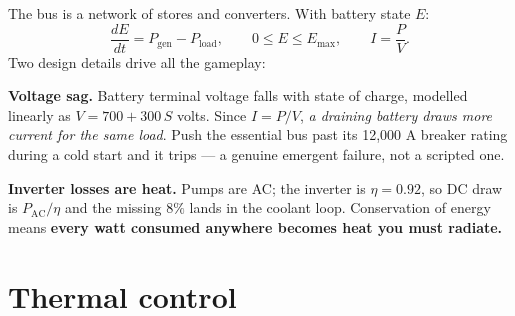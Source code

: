 \documentclass[11pt]{article}
\newcommand{\cbV}[3]{%
  \draw (#1,#2-0.28) -- (#1,#2-0.12);
  \draw (#1,#2+0.12) -- (#1,#2+0.28);
  \draw (#1,#2-0.12) -- ++(0.16,0.20);
  \fill (#1,#2-0.12) circle (0.5pt); \fill (#1,#2+0.12) circle (0.5pt);
  \node[lbl,right=1.0mm] at (#1,#2) {#3};}
\begin{document}
\begin{center}
\end{center}

The bus is a network of stores and converters. With battery state $E$:
\begin{equation}
\frac{dE}{dt}=P_{\text{gen}}-P_{\text{load}},\qquad 0\le E\le E_{\max},
\qquad I=\frac{P}{V}.
\end{equation}
Two design details drive all the gameplay:

\textbf{Voltage sag.} Battery terminal voltage falls with state of charge, modelled linearly as $V=700+300\,S$ volts. Since $I=P/V$, \emph{a draining battery draws more current for the same load}. Push the essential bus past its 12{,}000 A breaker rating during a cold start and it trips --- a genuine emergent failure, not a scripted one.

\textbf{Inverter losses are heat.} Pumps are AC; the inverter is $\eta=0.92$, so DC draw is $P_{\text{AC}}/\eta$ and the missing $8\%$ lands in the coolant loop. Conservation of energy means \textbf{every watt consumed anywhere becomes heat you must radiate.}

\section{Thermal control}
\end{document}

